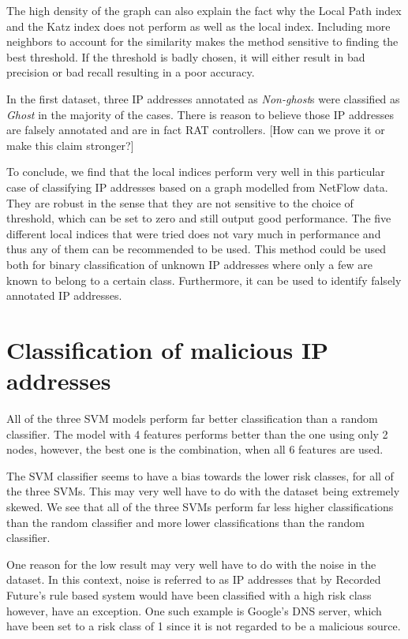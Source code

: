 The high density of the graph can also explain the fact why the Local Path index and the Katz index does not perform as well as the local index. Including more neighbors to account for the similarity makes the method sensitive to finding the best threshold. If the threshold is badly chosen, it will either result in bad precision or bad recall resulting in a poor accuracy.

In the first dataset, three IP addresses annotated as \textit{Non-ghost}s were classified as \textit{Ghost} in the majority of the cases. There is reason to believe those IP addresses are falsely annotated and are in fact RAT controllers. [How can we prove it or make this claim stronger?]

To conclude, we find that the local indices perform very well in this particular case of classifying IP addresses based on a graph modelled from NetFlow data. They are robust in the sense that they are not sensitive to the choice of threshold, which can be set to zero and still output good performance. The five different local indices that were tried does not vary much in performance and thus any of them can be recommended to be used. This method could be used both for binary classification of unknown IP addresses where only a few are known to belong to a certain class. Furthermore, it can be used to identify falsely annotated IP addresses. 

\section{Classification of malicious IP addresses}
All of the three SVM models perform far better classification than a random classifier. The model with 4 features performs better than the one using only 2 nodes, however, the best one is the combination, when all 6 features are used. 

The SVM classifier seems to have a bias towards the lower risk classes, for all of the three SVMs. This may very well have to do with the dataset being extremely skewed. We see that all of the three SVMs perform far less higher classifications than the random classifier and more lower classifications than the random classifier.


One reason for the low result may very well have to do with the noise in the dataset. In this context, noise is referred to as IP addresses that by Recorded Future's rule based system would have been classified with a high risk class however, have an exception. One such example is Google's DNS server, which have been set to a risk class of 1 since it is not regarded to be a malicious source. 

